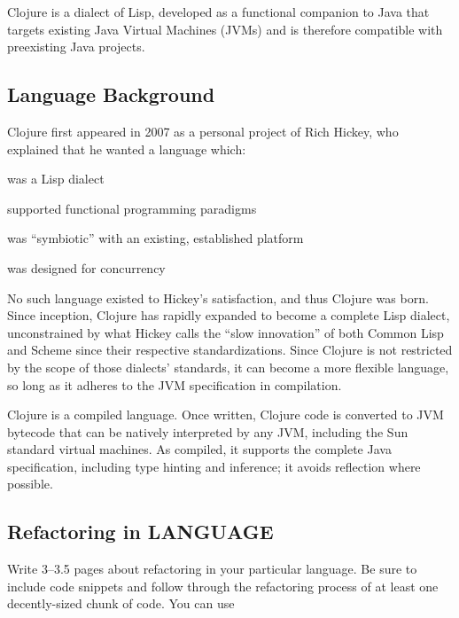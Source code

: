 \documentclass{article}
\begin{document}

Clojure is a dialect of Lisp, developed as a functional companion to Java that targets existing Java Virtual Machines (JVMs) and is therefore compatible with preexisting Java projects. 

\subsection*{Language Background}

Clojure first appeared in 2007 as a personal project of Rich Hickey, who explained that he wanted a language which:

\begin{itemize*}
\item was a Lisp dialect
\item supported functional programming paradigms
\item was ``symbiotic'' with an existing, established platform
\item was designed for concurrency
\end{itemize*}

No such language existed to Hickey's satisfaction, and thus Clojure was born. Since inception, Clojure has rapidly expanded to become a complete Lisp dialect, unconstrained by what Hickey calls the ``slow innovation'' of both Common Lisp and Scheme since their respective standardizations. Since Clojure is not restricted by the scope of those dialects' standards, it can become a more flexible language, so long as it adheres to the JVM specification in compilation.

Clojure is a compiled language. Once written, Clojure code is converted to JVM bytecode that can be natively interpreted by any JVM, including the Sun standard virtual machines. As compiled, it supports the complete Java specification, including type hinting and inference; it avoids reflection where possible. 

\subsection*{Refactoring in LANGUAGE}

Write 3--3.5 pages about refactoring in your particular language. Be sure to include code snippets and follow through the refactoring process of at least one decently-sized chunk of code. You can use
\end{document}
